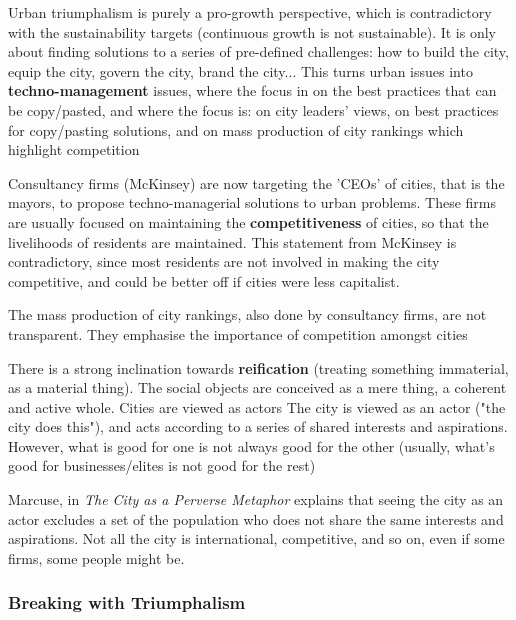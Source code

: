 \documentclass{article}
\begin{document}
\begin{outline}
  \1 Urban triumphalism is purely a pro-growth perspective, which is contradictory with the sustainability targets (continuous growth is not sustainable). 
  \1 It is only about finding solutions to a series of pre-defined challenges: how to build the city, equip the city, govern the city, brand the city... This turns urban issues into \textbf{techno-management} issues, where the focus in on the best practices that can be copy/pasted, and where the focus is: 
  \2 on city leaders' views, 
  \2 on best practices for copy/pasting solutions, and 
  \2 on mass production of city rankings which highlight competition

  \1 Consultancy firms (McKinsey) are now targeting the 'CEOs' of cities, that is the mayors, to propose techno-managerial solutions to urban problems. 
These firms are usually focused on maintaining the \textbf{competitiveness} of cities, so that the livelihoods of residents are maintained. This statement from McKinsey is contradictory, since most residents are not involved in making the city competitive, and could be better off if cities were less capitalist.

The mass production of city rankings, also done by consultancy firms, are not transparent. They emphasise the importance of competition amongst cities

  \1 There is a strong inclination towards \textbf{reification} (treating something immaterial, as a material thing). 
  	\2 The social objects are conceived as a mere thing, a coherent and active whole. Cities are viewed as actors
	\2 The city is viewed as an actor ("the city does this"), and acts according to a series of shared interests and aspirations. However, what is good for one is not always good for the other (usually, what's good for businesses/elites is not good for the rest) 
\end{outline}

Marcuse, in \textit{The City as a Perverse Metaphor} explains that seeing the city as an actor excludes a set of the population who does not share the same interests and aspirations. Not all the city is international, competitive, and so on, even if some firms, some people might be. 

\subsubsection{Breaking with Triumphalism}
\end{document}
